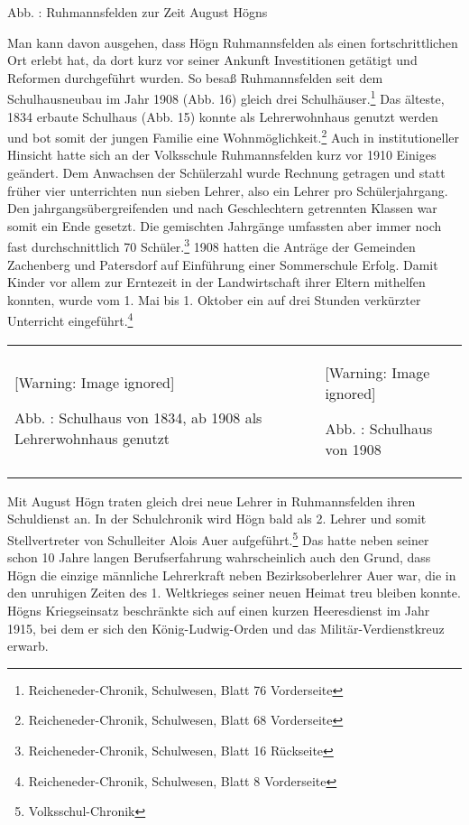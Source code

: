 \documentclass[a4paper]{article}
\newcounter{Abb}
\renewcommand\theAbb{\arabic{Abb}}
\begin{document}
Abb. \stepcounter{Abb}{\theAbb}: Ruhmannsfelden zur Zeit August Högns

Man kann davon ausgehen, dass Högn Ruhmannsfelden als einen
fortschrittlichen Ort erlebt hat, da dort kurz vor seiner Ankunft
Investitionen getätigt und Reformen durchgeführt wurden. So besaß
Ruhmannsfelden seit dem Schulhausneubau im Jahr 1908 (Abb. 16) gleich
drei Schulhäuser.\footnote{ Reicheneder-Chronik, Schulwesen, Blatt 76
Vorderseite} Das älteste, 1834 erbaute Schulhaus (Abb. 15) konnte als
Lehrerwohnhaus genutzt werden und bot somit der jungen Familie eine
Wohnmöglichkeit.\footnote{ Reicheneder-Chronik, Schulwesen, Blatt 68
Vorderseite} Auch in institutioneller Hinsicht hatte sich an der
Volksschule Ruhmannsfelden kurz vor 1910 Einiges geändert. Dem
Anwachsen der Schülerzahl wurde Rechnung getragen und statt früher vier
unterrichten nun sieben Lehrer, also ein Lehrer pro Schülerjahrgang.
Den jahrgangsübergreifenden und nach Geschlechtern getrennten Klassen
war somit ein Ende gesetzt. Die gemischten Jahrgänge umfassten aber
immer noch fast durchschnittlich 70 Schüler.\footnote{
Reicheneder-Chronik, Schulwesen, Blatt 16 Rückseite} 1908 hatten die
Anträge der Gemeinden Zachenberg und Patersdorf auf Einführung einer
Sommerschule Erfolg. Damit Kinder vor allem zur Erntezeit in der
Landwirtschaft ihrer Eltern mithelfen konnten, wurde vom 1. Mai bis 1.
Oktober ein auf drei Stunden verkürzter Unterricht
eingeführt.\footnote{ Reicheneder-Chronik, Schulwesen, Blatt 8
Vorderseite}

\begin{flushleft}
\tablefirsthead{}
\tablehead{}
\tabletail{}
\tablelasttail{}
\begin{supertabular}{m{6.452cm}m{9.653cm}}
  [Warning: Image ignored] %
 
\label{bkm:Ref100034971}Abb. \stepcounter{Abb}{\theAbb}: Schulhaus von
1834, ab 1908 als Lehrerwohnhaus genutzt &
  [Warning: Image ignored] %
 
\label{bkm:Ref100034935}Abb. \stepcounter{Abb}{\theAbb}: Schulhaus von
1908\\
\end{supertabular}
\end{flushleft}
Mit August Högn traten gleich drei neue Lehrer in Ruhmannsfelden ihren
Schuldienst an. In der Schulchronik wird Högn bald als 2. Lehrer und
somit Stellvertreter von Schulleiter Alois Auer aufgeführt.\footnote{
Volksschul-Chronik} Das hatte neben seiner schon 10 Jahre langen
Berufserfahrung wahrscheinlich auch den Grund, dass Högn die einzige
männliche Lehrerkraft neben Bezirksoberlehrer Auer war, die in den
unruhigen Zeiten des 1. Weltkrieges seiner neuen Heimat treu bleiben
konnte. Högns Kriegseinsatz beschränkte sich auf einen kurzen
Heeresdienst im Jahr 1915, bei dem er sich den König-Ludwig-Orden und
das Militär-Verdienstkreuz erwarb.
\end{document}
